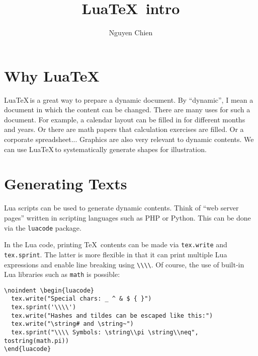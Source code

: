 \documentclass[a4paper]{article}
\title{Lua\!\TeX \, intro}
\author{Nguyen Chien}
\newcommand{\LuaTeX}{Lua\!\TeX \,}
\begin{document}
\maketitle

\section{Why \LuaTeX}

\LuaTeX is a great way to prepare a dynamic document. By ``dynamic'', I mean a document in which the content can be changed. There are many uses for such a document. For example, a calendar layout can be filled in for different months and years. Or there are math papers that calculation exercises are filled. Or a corporate spreadsheet... Graphics are also very relevant to dynamic contents. We can use \LuaTeX to systematically generate shapes for illustration.


\section{Generating Texts}






Lua scripts can be used to generate dynamic contents. Think of ``web server pages'' written in scripting languages such as PHP or Python. This can be done via the \texttt{luacode} package.

\medskip

In the Lua code, printing \TeX\, contents can be made via \texttt{tex.write} and \texttt{tex.sprint}. The latter is more flexible in that it can print multiple Lua expressions and enable line breaking using \verb#\\\\#. Of course, the use of built-in Lua libraries such as \texttt{math} is possible:

\begin{verbatim}
\noindent \begin{luacode}
  tex.write("Special chars: _ ^ & $ { }")
  tex.sprint('\\\\')
  tex.write("Hashes and tildes can be escaped like this:")
  tex.write("\string# and \string~")
  tex.sprint("\\\\ Symbols: \string\\pi \string\\neq", tostring(math.pi))
\end{luacode}
\end{verbatim}
\end{document}
